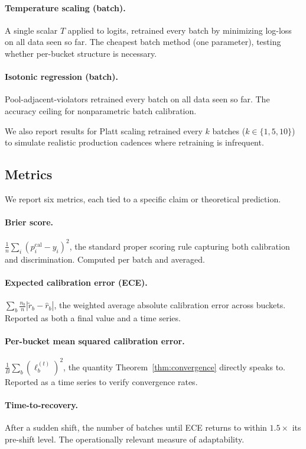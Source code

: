 \documentclass[12pt, letterpaper]{article}
\theoremstyle{definition}
\theoremstyle{remark}
\begin{document}
\paragraph{Temperature scaling (batch).} A single scalar $T$ applied to logits, retrained every batch by minimizing log-loss on all data seen so far. The cheapest batch method (one parameter), testing whether per-bucket structure is necessary.

\paragraph{Isotonic regression (batch).} Pool-adjacent-violators retrained every batch on all data seen so far. The accuracy ceiling for nonparametric batch calibration.

We also report results for Platt scaling retrained every $k$ batches ($k \in \{1, 5, 10\}$) to simulate realistic production cadences where retraining is infrequent.

\subsection{Metrics}

We report six metrics, each tied to a specific claim or theoretical prediction.

\paragraph{Brier score.} $\frac{1}{n}\sum_i (p_i^{\mathrm{cal}} - y_i)^2$, the standard proper scoring rule capturing both calibration and discrimination. Computed per batch and averaged.

\paragraph{Expected calibration error (ECE).} $\sum_b \frac{n_b}{n}|\tilde{r}_b - \hat{r}_b|$, the weighted average absolute calibration error across buckets. Reported as both a final value and a time series.

\paragraph{Per-bucket mean squared calibration error.} $\frac{1}{B}\sum_b (\ell_b^{(t)})^2$, the quantity Theorem~\ref{thm:convergence} directly speaks to. Reported as a time series to verify convergence rates.

\paragraph{Time-to-recovery.} After a sudden shift, the number of batches until ECE returns to within $1.5\times$ its pre-shift level. The operationally relevant measure of adaptability.
\end{document}
